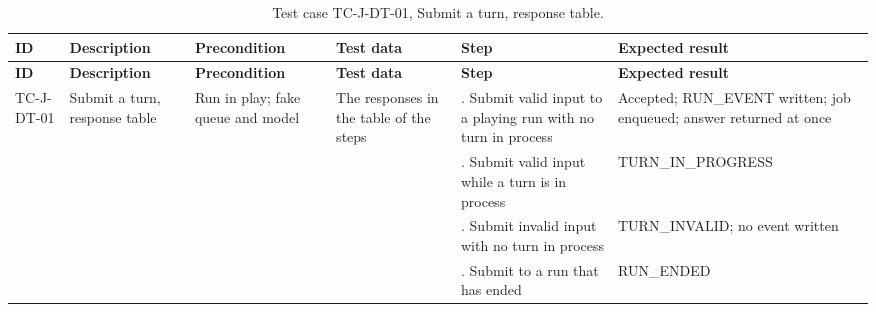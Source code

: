{\footnotesize{}\renewcommand{\arraystretch}{1.1}
\begin{longtable}{|>{\raggedright\arraybackslash}p{}|>{\raggedright\arraybackslash}p{}|>{\raggedright\arraybackslash}p{}|>{\raggedright\arraybackslash}p{}|>{\raggedright\arraybackslash}p{}|>{\raggedright\arraybackslash}p{}|}
\caption{Test case TC-J-DT-01, Submit a turn, response table.} \\
\hline
\textbf{ID} & \textbf{Description} & \textbf{Precondition} & \textbf{Test data} & \textbf{Step} & \textbf{Expected result} \\ \hline
\endfirsthead
\hline
\textbf{ID} & \textbf{Description} & \textbf{Precondition} & \textbf{Test data} & \textbf{Step} & \textbf{Expected result} \\ \hline
\endhead
TC-J-DT-01 & Submit a turn, response table & Run in play; fake queue and model & The responses in the table of the steps & 1. Submit valid input to a playing run with no turn in process & Accepted; RUN\_EVENT written; job enqueued; answer returned at once \\ \cline{5-6}
 &  &  &  & 2. Submit valid input while a turn is in process & TURN\_\allowbreak{}IN\_\allowbreak{}PROGRESS \\ \cline{5-6}
 &  &  &  & 3. Submit invalid input with no turn in process & TURN\_\allowbreak{}INVALID; no event written \\ \cline{5-6}
 &  &  &  & 4. Submit to a run that has ended & RUN\_ENDED \\ \hline
\end{longtable}
}

